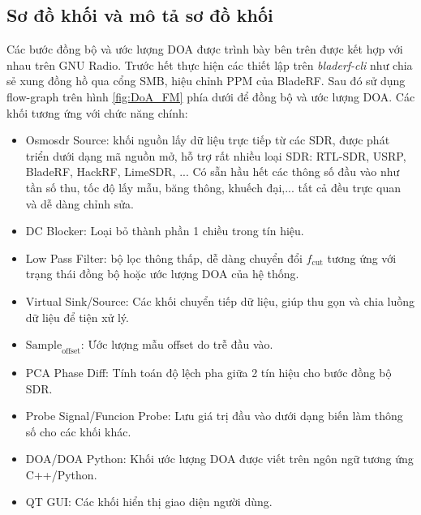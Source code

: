 {\subsection{Sơ đồ khối và mô tả sơ đồ khối}

Các bước đồng bộ và ước lượng DOA được trình bày bên trên được kết hợp với nhau trên GNU Radio. Trước hết thực hiện các thiết lập trên \textit{bladerf-cli} như chia sẻ xung đồng hồ qua cổng SMB, hiệu chỉnh PPM của BladeRF. Sau đó sử dụng flow-graph trên hình \ref{fig:DoA_FM} phía dưới để đồng bộ và ước lượng DOA. Các khối tương ứng với chức năng chính:
\begin{itemize}
	\item Osmosdr Source: khối nguồn lấy dữ liệu trực tiếp từ các SDR, được phát triển dưới dạng mã nguồn mở,  hỗ trợ rất nhiều loại SDR: RTL-SDR, USRP, BladeRF, HackRF, LimeSDR, ... Có sẵn hầu hết các thông số đầu vào như tần số thu, tốc độ lấy mẫu, băng thông, khuếch đại,... tất cả đều trực quan và dễ dàng chỉnh sửa. %
	\item DC Blocker: Loại bỏ thành phần 1 chiều trong tín hiệu.
	\item Low Pass Filter: bộ lọc thông thấp, dễ dàng chuyển đổi $f_\textrm{cut}$ tương ứng với trạng thái đồng bộ hoặc ước lượng DOA của hệ thống.
	\item Virtual Sink/Source: Các khối chuyển tiếp dữ liệu, giúp thu gọn và chia luồng dữ liệu để tiện xử lý.
	\item $\textrm{Sample}_\textrm{offset}$: Ước lượng mẫu offset do trễ đầu vào.
	\item PCA Phase Diff: Tính toán độ lệch pha giữa 2 tín hiệu cho bước đồng bộ SDR.
	\item Probe Signal/Funcion Probe: Lưu giá trị đầu vào dưới dạng biến làm thông số cho các khối khác.
	\item DOA/DOA Python: Khối ước lượng DOA được viết trên ngôn ngữ tương ứng C++/Python.
	\item QT GUI: Các khối hiển thị giao diện người dùng.
\end{itemize}
\afterpage{\clearpage}
\begin{figure} [!ht]
	\centering

\end{figure}}
